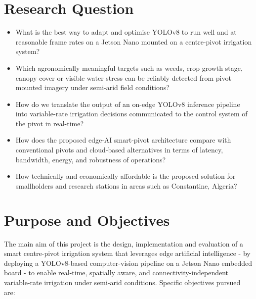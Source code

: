 \documentclass[12pt,a4paper]{report}
\begin{document}
\section{Research Question}

\begin{itemize}
    \item What is the best way to adapt and optimise YOLOv8 to run well and at reasonable frame rates on a Jetson Nano mounted on a centre-pivot irrigation system?
    \item Which agronomically meaningful targets such as weeds, crop growth stage, canopy cover or visible water stress can be reliably detected from pivot mounted imagery under semi-arid field conditions?
    \item How do we translate the output of an on-edge YOLOv8 inference pipeline into variable-rate irrigation decisions communicated to the control system of the pivot in real-time?
    \item How does the proposed edge-AI smart-pivot architecture compare with conventional pivots and cloud-based alternatives in terms of latency, bandwidth, energy, and robustness of operations?
    \item How technically and economically affordable is the proposed solution for smallholders and research stations in areas such as Constantine, Algeria?
\end{itemize}

\section{Purpose and Objectives}

The main aim of this project is the design, implementation and evaluation of a smart centre-pivot irrigation system that leverages edge artificial intelligence - by deploying a YOLOv8-based computer-vision pipeline on a Jetson Nano embedded board - to enable real-time, spatially aware, and connectivity-independent variable-rate irrigation under semi-arid conditions. Specific objectives pursued are:
\end{document}
